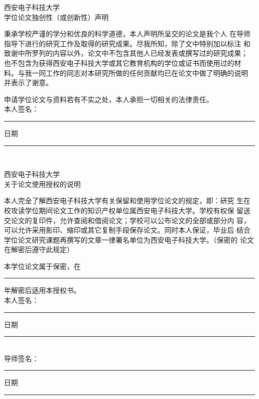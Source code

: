 \begin{center}
\heiti{}西安电子科技大学\\[5mm]
	学位论文独创性（或创新性）声明
\end{center}\vspace{1cm}

\songti{}秉承学校严谨的学分和优良的科学道德，本人声明所呈交的论文是我个人
在导师指导下进行的研究工作及取得的研究成果。尽我所知，除了文中特别加以标注
和致谢中所罗列的内容以外，论文中不包含其他人已经发表或撰写过的研究成果；
也不包含为获得西安电子科技大学或其它教育机构的学位或证书而使用过的材
料。与我一同工作的同志对本研究所做的任何贡献均已在论文中做了明确的说明
并表示了谢意。

申请学位论文与资料若有不实之处，本人承担一切相关的法律责任。\\[3mm]

	本人签名：\rule{2.6cm}{0.75pt}  \hspace{3cm}  日期\rule{3cm}{0.75pt}\\[2cm]

\begin{center}
\heiti{}西安电子科技大学\\[5mm]
	关于论文使用授权的说明
\end{center}\vspace{1cm}

\songti{}本人完全了解西安电子科技大学有关保留和使用学位论文的规定，即：研究
生在校攻读学位期间论文工作的知识产权单位属西安电子科技大学。学校有权保
留送交论文的复印件，允许查阅和借阅论文；学校可以公布论文的全部或部分内
容，可以允许采用影印、缩印或其它复制手段保存论文。同时本人保证，毕业后
结合学位论文研究课题再撰写的文章一律署名单位为西安电子科技大学。（保密的
论文在解密后遵守此规定）

本学位论文属于保密，在\rule{6mm}{0.75pt}年解密后适用本授权书。\\[3mm]

	本人签名：\rule{2.6cm}{0.75pt}  \hspace{3cm}  日期\rule{3cm}{0.75pt}\\[3mm]

	导师签名：\rule{2.6cm}{0.75pt}  \hspace{3cm}  日期\rule{3cm}{0.75pt}
